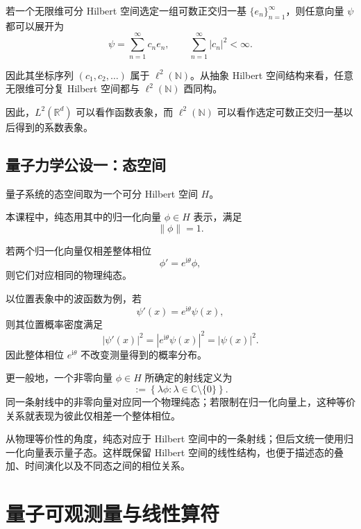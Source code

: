 \documentclass[UTF8,a4paper,11pt,openany]{ctexbook}
\begin{document}
若一个无限维可分 Hilbert 空间选定一组可数正交归一基 $\{e_n\}_{n=1}^{\infty}$，则任意向量 $\psi$ 都可以展开为
\[
\psi
=
\sum_{n=1}^{\infty}c_n e_n,
\qquad
\sum_{n=1}^{\infty}|c_n|^2<\infty.
\]

因此其坐标序列 $(c_1,c_2,\ldots)$ 属于 $\ell^2(\mathbb N)$。从抽象 Hilbert 空间结构来看，任意无限维可分复 Hilbert 空间都与 $\ell^2(\mathbb N)$ 酉同构。

因此，$L^2(\mathbb R^d)$ 可以看作函数表象，而 $\ell^2(\mathbb N)$ 可以看作选定可数正交归一基以后得到的系数表象。

\subsection{量子力学公设一：态空间}

\begin{definition}[态空间]
量子系统的态空间取为一个可分 Hilbert 空间 $H$。
\end{definition}

本课程中，纯态用其中的归一化向量 $\phi\in H$ 表示，满足
\[
\|\phi\|=1.
\]

若两个归一化向量仅相差整体相位
\[
\phi'
=
e^{\mathrm{i}\theta}\phi,
\]
则它们对应相同的物理纯态。

以位置表象中的波函数为例，若
\[
\psi'(x)
=
e^{\mathrm{i}\theta}\psi(x),
\]
则其位置概率密度满足
\[
|\psi'(x)|^2
=
|e^{\mathrm{i}\theta}\psi(x)|^2
=
|\psi(x)|^2.
\]
因此整体相位 $e^{\mathrm{i}\theta}$ 不改变测量得到的概率分布。

更一般地，一个非零向量 $\phi\in H$ 所确定的射线定义为
\begin{equation}
    [\phi]
    :=
    \left\{
    \lambda\phi:
    \lambda\in\mathbb C\setminus\{0\}
    \right\}.
\end{equation}
同一条射线中的非零向量对应同一个物理纯态；若限制在归一化向量上，这种等价关系就表现为彼此仅相差一个整体相位。

从物理等价性的角度，纯态对应于 Hilbert 空间中的一条射线；但后文统一使用归一化向量表示量子态。这样既保留 Hilbert 空间的线性结构，也便于描述态的叠加、时间演化以及不同态之间的相位关系。



\section{量子可观测量与线性算符}
\end{document}
